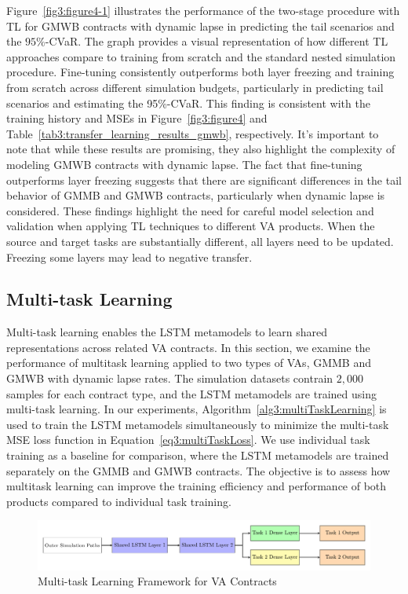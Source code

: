 Figure~\ref{fig3:figure4-1} illustrates the performance of the two-stage procedure with TL for GMWB contracts with dynamic lapse in predicting the tail scenarios and the $95\%$-CVaR.
The graph provides a visual representation of how different TL approaches compare to training from scratch and the standard nested simulation procedure.
Fine-tuning consistently outperforms both layer freezing and training from scratch across different simulation budgets, particularly in predicting tail scenarios and estimating the 95\%-CVaR. 
This finding is consistent with the training history and MSEs in Figure~\ref{fig3:figure4} and Table~\ref{tab3:transfer_learning_results_gmwb}, respectively.
It's important to note that while these results are promising, they also highlight the complexity of modeling GMWB contracts with dynamic lapse. 
The fact that fine-tuning outperforms layer freezing suggests that there are significant differences in the tail behavior of GMMB and GMWB contracts, particularly when dynamic lapse is considered. 
These findings highlight the need for careful model selection and validation when applying TL techniques to different VA products.
When the source and target tasks are substantially different, all layers need to be updated.
Freezing some layers may lead to negative transfer.


\subsection{Multi-task Learning}

Multi-task learning enables the LSTM metamodels to learn shared representations across related VA contracts.
In this section, we examine the performance of multitask learning applied to two types of VAs, GMMB and GMWB with dynamic lapse rates.
The simulation datasets contrain $2,\!000$ samples for each contract type, and the LSTM metamodels are trained using multi-task learning. 
In our experiments, Algorithm~\ref{alg3:multiTaskLearning} is used to train the LSTM metamodels simultaneously to minimize the multi-task MSE loss function in Equation~\ref{eq3:multiTaskLoss}.
We use individual task training as a baseline for comparison, where the LSTM metamodels are trained separately on the GMMB and GMWB contracts.
The objective is to assess how multitask learning can improve the training efficiency and performance of both products compared to individual task training.

\begin{figure}[ht!]
    \includegraphics[width=\textwidth]{./project3/tikz/mtl.pdf}
    \caption{Multi-task Learning Framework for VA Contracts}
    \label{fig3:mtl}
\end{figure}

